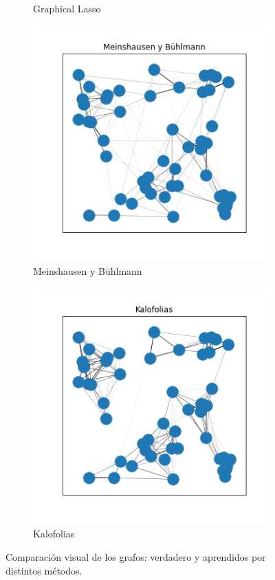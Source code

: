 \documentclass{article}
\begin{document}
\begin{figure}[htb]
\begin{subfigure}[t]{0.24\linewidth}
        \caption{Graphical Lasso}
    \end{subfigure}\hfill
    \begin{subfigure}[t]{0.24\linewidth}
        \centering
        \includegraphics[width=\textwidth]{imagenes/generated_graph_syntetic/meinshausen_buhlmann.png}
        \caption{Meinshausen y Bühlmann}
    \end{subfigure}\hfill
    \begin{subfigure}[t]{0.24\linewidth}
        \centering
        \includegraphics[width=\textwidth]{imagenes/generated_graph_syntetic/kalofolias.png}
        \caption{Kalofolias}
    \end{subfigure}
    \caption{Comparación visual de los grafos: verdadero y aprendidos por distintos métodos.}
    \label{fig:generated_graphs_syntetic}
\end{figure}
\end{document}
